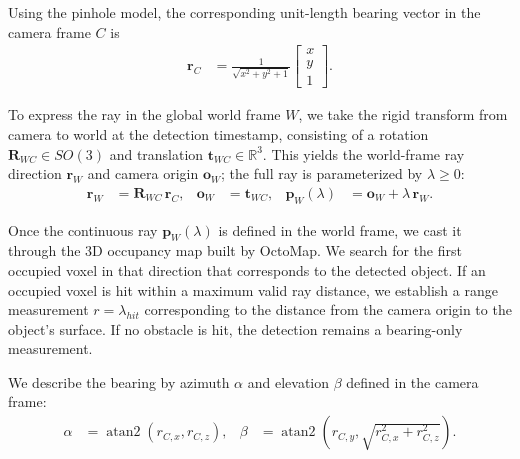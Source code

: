 \documentclass[
	parspace, %
	noindent, %
	final, %
]{elteikthesis}
\begin{document}
Using the pinhole model, the corresponding unit-length bearing vector in the camera frame $C$ is
\begin{align}
\mathbf{r}_C &= \frac{1}{\sqrt{x^2 + y^2 + 1}}\begin{bmatrix}x\\y\\1\end{bmatrix}.
\end{align}

To express the ray in the global world frame $W$, we take the rigid transform from camera to world at the detection timestamp, consisting of a rotation $\mathbf{R}_{WC}\in SO(3)$ and translation $\mathbf{t}_{WC}\in\mathbb{R}^3$. This yields the world-frame ray direction $\mathbf{r}_W$ and camera origin $\mathbf{o}_W$; the full ray is parameterized by $\lambda\ge 0$:
\begin{align}
\mathbf{r}_W &= \mathbf{R}_{WC}\,\mathbf{r}_C,
& \mathbf{o}_W &= \mathbf{t}_{WC},
& \mathbf{p}_W(\lambda) &= \mathbf{o}_W + \lambda\,\mathbf{r}_W.
\end{align}

Once the continuous ray $\mathbf{p}_W(\lambda)$ is defined in the world frame, we cast it through the 3D occupancy map built by OctoMap. We search for the first occupied voxel in that direction that corresponds to the detected object. If an occupied voxel is hit within a maximum valid ray distance, we establish a range measurement $r = \lambda_{hit}$ corresponding to the distance from the camera origin to the object's surface. If no obstacle is hit, the detection remains a bearing-only measurement.

We describe the bearing by azimuth $\alpha$ and elevation $\beta$ defined in the camera frame:
\begin{align}
\alpha &= \operatorname{atan2}(r_{C,x}, r_{C,z}),
& \beta &= \operatorname{atan2}(r_{C,y}, \sqrt{r_{C,x}^2 + r_{C,z}^2}).
\end{align}
\end{document}
